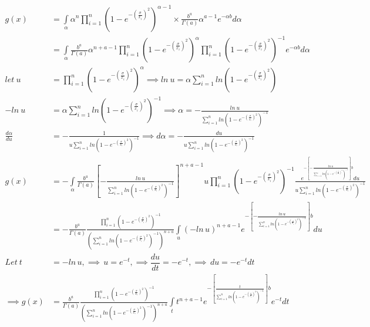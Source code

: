 \documentclass[a4paper,12pt]{report}
\begin{document}
{\footnotesize
\[\begin{split}
g(x)&=\int\limits_{\alpha}\alpha^n \prod\limits_{ i=1 }^{n}\left(1-e^{-\left(\frac{\sigma}{x_i}\right)^2}\right)^{\alpha-1}\times \frac{b^a}{\Gamma(a)}\alpha^{a-1}e^{-\alpha b}d\alpha \\
&=\int\limits_{\alpha}\frac{b^a}{\Gamma(a)}\alpha^{n+a-1}\prod\limits_{ i=1 }^{n}\left(1-e^{-\left(\frac{\sigma}{x_i}\right)^2}\right)^{\alpha}\prod\limits_{ i=1 }^{n}\left(1-e^{-\left(\frac{\sigma}{x_i}\right)^2}\right)^{-1}e^{-\alpha b} d\alpha\\
let\ u	&=\prod\limits_{ i=1 }^{n}\left(1-e^{-\left(\frac{\sigma}{x_i}\right)^2}\right)^{\alpha}\implies
ln\ u=\alpha\sum\limits_{ i=1 }^{n}ln\left(1-e^{-\left(\frac{\sigma}{x_i}\right)^2}\right)\\
-ln\ u	&=\alpha\sum\limits_{ i=1 }^{n}ln\left(1-e^{-\left(\frac{\sigma}{x_i}\right)^2}\right)^{-1}\implies
\alpha=-\frac{ln\ u}{\sum\limits_{ i=1 }^{n}ln\left(1-e^{-\left(\frac{\sigma}{x_i}\right)^2}\right)^{-1}}\\
\frac{d\alpha}{du}&= -\frac{1}{u\sum\limits_{ i=1 }^{n}ln\left(1-e^{-\left(\frac{\sigma}{x_i}\right)^2}\right)^{-1}}\implies
d\alpha	=-\frac{du}{u\sum\limits_{ i=1 }^{n}ln\left(1-e^{-\left(\frac{\sigma}{x_i}\right)^2}\right)^{-1}}\\
g(x)&=-\int\limits_{\alpha}\frac{b^a}{\Gamma(a)}\left[-\frac{ln\,u}{\sum\limits_{ i=1 }^{n}ln\left(1-e^{-\left(\frac{\sigma}{x_i}\right)^2}\right)^{-1}}\right]^{n+a-1}u\prod\limits_{ i=1 }^{n}\left(1-e^{-\left(\frac{\sigma}{x_i}\right)^2}\right)^{-1}\frac{e^{-\left[-\frac{ln\,u}{\sum\limits_{ i=1 }^{n}ln\left(1-e^{-\left(\frac{\sigma}{x_i}\right)^2}\right)^{-1}}\right]b}du}{u\sum\limits_{ i=1 }^{n}ln\left(1-e^{-\left(\frac{\sigma}{x_i}\right)^2}\right)^{-1}}\\
&=-\frac{b^a}{\Gamma(a)}\frac{\prod\limits_{ i=1 }^{n}\left(1-e^{-\left(\frac{\sigma}{x_i}\right)^2}\right)^{-1}}{\left(\sum\limits_{ i=1 }^{n}ln\left(1-e^{-\left(\frac{\sigma}{x_i}\right)^2}\right)^{-1}\right)^{n+a}}\int\limits_{u}(-ln\,u)^{n+a-1} e^{-\left[-\frac{ln\,u}{\sum\limits_{ i=1 }^{n}ln\left(1-e^{-\left(\frac{\sigma}{x_i}\right)^2}\right)^{-1}}\right]b}du\\
Let\ t&=-ln\,u,\implies\,u=e^{-t},\implies\dfrac{du}{dt}=-e^{-t},\implies \, du=-e^{-t}dt\\
\implies g(x)&=\frac{b^a}{\Gamma(a)}\frac{\prod\limits_{ i=1 }^{n}\left(1-e^{-\left(\frac{\sigma}{x_i}\right)^2}\right)^{-1}}{\left(\sum\limits_{ i=1 }^{n}ln\left(1-e^{-\left(\frac{\sigma}{x_i}\right)^2}\right)^{-1}\right)^{n+a}}\int\limits_{t}t^{n+a-1}e^{-\left[\frac{t}{\sum\limits_{ i=1 }^{n}ln\left(1-e^{-\left(\frac{\sigma}{x_i}\right)^2}\right)^{-1}}\right]b}e^{-t}dt\\

\end{split}\]}
\end{document}
